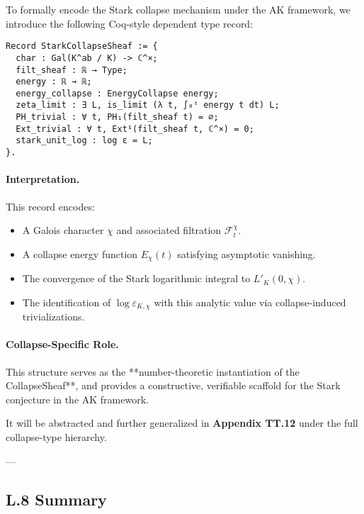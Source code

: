 \documentclass[11pt]{article}
\begin{document}
To formally encode the Stark collapse mechanism under the AK framework,  
we introduce the following Coq-style dependent type record:

\begin{verbatim}
Record StarkCollapseSheaf := {
  char : Gal(K^ab / K) -> ℂ^×;
  filt_sheaf : ℝ → Type;
  energy : ℝ → ℝ;
  energy_collapse : EnergyCollapse energy;
  zeta_limit : ∃ L, is_limit (λ t, ∫₀ᵗ energy t dt) L;
  PH_trivial : ∀ t, PH₁(filt_sheaf t) = ∅;
  Ext_trivial : ∀ t, Ext¹(filt_sheaf t, ℂ^×) = 0;
  stark_unit_log : log ε = L;
}.
\end{verbatim}

\paragraph{Interpretation.}
This record encodes:
\begin{itemize}
  \item A Galois character $\chi$ and associated filtration $\mathcal{F}^\chi_t$.
  \item A collapse energy function $E_\chi(t)$ satisfying asymptotic vanishing.
  \item The convergence of the Stark logarithmic integral to $L'_K(0,\chi)$.
  \item The identification of $\log \varepsilon_{K,\chi}$ with this analytic value via collapse-induced trivializations.
\end{itemize}

\paragraph{Collapse-Specific Role.}
This structure serves as the **number-theoretic instantiation of the CollapseSheaf**,  
and provides a constructive, verifiable scaffold for the Stark conjecture in the AK framework.

It will be abstracted and further generalized in \textbf{Appendix TT.12} under the full collapse-type hierarchy.

---

\subsection*{L.8 Summary}
\end{document}
